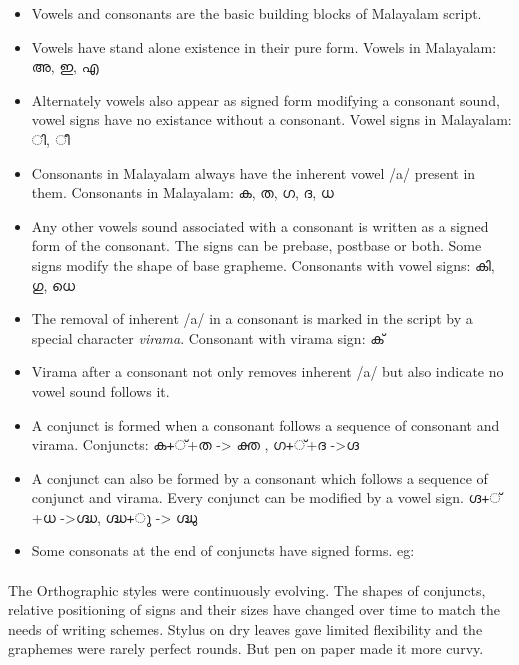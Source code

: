 \documentclass[10pt]{article}
\begin{document}
\begin{itemize}
\item
Vowels and consonants are the basic building blocks of Malayalam script. 
\item
 Vowels have stand alone existence in their pure form. Vowels in Malayalam: \begingroup \manjari അ, ഇ, എ \endgroup
\item
Alternately vowels also appear as signed form modifying a consonant sound, vowel signs have no existance  without a consonant.  Vowel signs in Malayalam: \begingroup \manjari  ി, ീ\endgroup
\item Consonants in Malayalam always have the inherent vowel /a/ present in them. Consonants in Malayalam: \begingroup \manjari  ക, ത, ഗ, ദ, ധ \endgroup
\item
 Any other vowels sound associated with a consonant is written as a signed form of the consonant. The signs can be prebase, postbase or both. Some signs modify the shape of base grapheme. Consonants with vowel signs:   \begingroup \manjari കി, ഗു, ധെ \endgroup 

\item
The removal of inherent /a/ in a consonant is marked in the script by a special character \textit{virama}.  Consonant with virama sign: \begingroup \manjari ക് \endgroup
\item
Virama after a consonant not only removes inherent /a/ but also indicate no vowel sound follows it. 
\item
A conjunct is formed when a consonant follows a sequence of consonant and virama. Conjuncts: \begingroup \manjari ക+്+ത -> ക്ത , ഗ+്+ദ ->ഗ്ദ \endgroup
\item
 A conjunct can also be formed by a consonant which follows a sequence of conjunct and virama. Every conjunct can be modified by a vowel sign.  \begingroup \manjari ഗ്ദ+്+ധ ->ഗ്ദ്ധ, ഗ്ദ്ധ+ു -> ഗ്ദ്ധു  \endgroup

\item
Some consonats at the end of conjuncts have signed forms. eg: 

\end{itemize}


\paragraph{}

 The Orthographic styles were continuously evolving. The shapes of conjuncts, relative positioning of signs and their sizes have changed over time to match the needs of writing schemes. Stylus on dry leaves gave limited flexibility and the graphemes were rarely perfect rounds. But pen on paper made it more curvy. 
\end{document}
